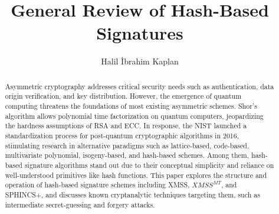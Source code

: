 \documentclass[runningheads]{llncs}
\begin{document}
\title{General Review of Hash-Based Signatures }

\author{Halil İbrahim Kaplan}


\maketitle

\begin{abstract}
Asymmetric cryptography addresses critical security needs such as 
authentication, data origin verification, and key distribution. However, 
the emergence of quantum computing threatens the foundations of most 
existing asymmetric schemes. Shor's algorithm allows polynomial time 
factorization on quantum computers, jeopardizing the hardness assumptions
 of RSA and ECC. In response, the NIST launched a standardization process 
 for post-quantum cryptographic algorithms in 2016, stimulating research 
 in alternative paradigms such as lattice-based, code-based, multivariate 
 polynomial, isogeny-based, and hash-based schemes. Among them, hash-based
  signature algorithms stand out due to their conceptual simplicity and 
  reliance on well-understood primitives like hash functions. This paper 
  explores the structure and operation of hash-based signature schemes 
  including XMSS, $XMSS^{MT}$, and SPHINCS+, and discusses known 
  cryptanalytic techniques targeting them, such as intermediate 
  secret-guessing and forgery attacks.


\end{abstract}







\printbibliography
\end{document}
